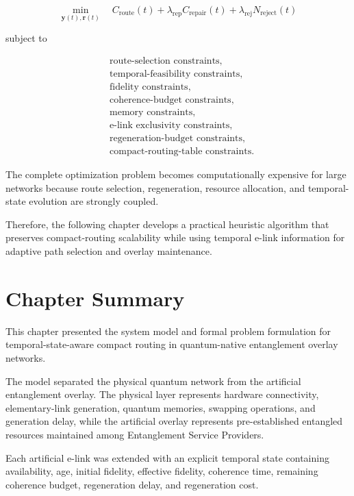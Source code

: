 \begin{equation}
\min_{\mathbf{y}(t),\mathbf{r}(t)}
\quad
C_{\mathrm{route}}(t)
+
\lambda_{\mathrm{rep}}
C_{\mathrm{repair}}(t)
+
\lambda_{\mathrm{rej}}
N_{\mathrm{reject}}(t)
\end{equation}

subject to

\begin{align}
&\text{route-selection constraints},\\
&\text{temporal-feasibility constraints},\\
&\text{fidelity constraints},\\
&\text{coherence-budget constraints},\\
&\text{memory constraints},\\
&\text{e-link exclusivity constraints},\\
&\text{regeneration-budget constraints},\\
&\text{compact-routing-table constraints}.
\end{align}


The complete optimization problem becomes computationally expensive for large networks because route selection, regeneration, resource allocation, and temporal-state evolution are strongly coupled.

Therefore, the following chapter develops a practical heuristic algorithm that preserves compact-routing scalability while using temporal e-link information for adaptive path selection and overlay maintenance.


\section{Chapter Summary}

This chapter presented the system model and formal problem formulation for temporal-state-aware compact routing in quantum-native entanglement overlay networks.

The model separated the physical quantum network from the artificial entanglement overlay. The physical layer represents hardware connectivity, elementary-link generation, quantum memories, swapping operations, and generation delay, while the artificial overlay represents pre-established entangled resources maintained among Entanglement Service Providers.

Each artificial e-link was extended with an explicit temporal state containing availability, age, initial fidelity, effective fidelity, coherence time, remaining coherence budget, regeneration delay, and regeneration cost.


